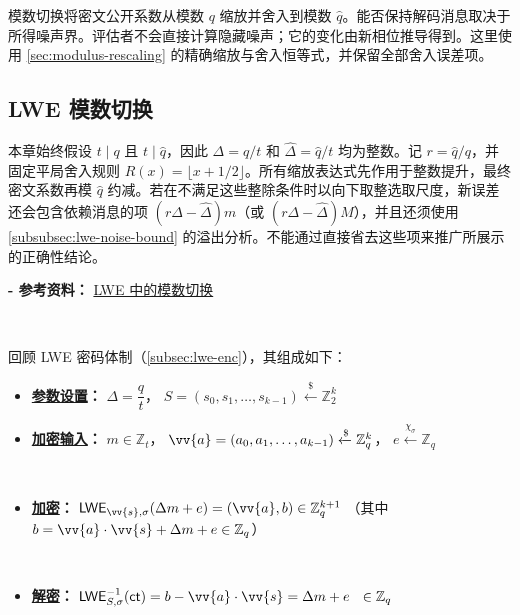 模数切换将密文公开系数从模数 $q$ 缩放并舍入到模数 $\hat q$。能否保持解码消息取决于所得噪声界。评估者不会直接计算隐藏噪声；它的变化由新相位推导得到。这里使用 \autoref{sec:modulus-rescaling} 的精确缩放与舍入恒等式，并保留全部舍入误差项。


\subsection{LWE 模数切换}
\label{subsec:modulus-switch-lwe}

本章始终假设 $t\mid q$ 且 $t\mid\hat q$，因此 $\Delta=q/t$ 和 $\hat\Delta=\hat q/t$ 均为整数。记 $r=\hat q/q$，并固定平局舍入规则 $R(x)=\lfloor x+1/2\rfloor$。所有缩放表达式先作用于整数提升，最终密文系数再模 $\hat q$ 约减。若在不满足这些整除条件时以向下取整选取尺度，新误差还会包含依赖消息的项 $(r\Delta-\hat\Delta)m$（或 $(r\Delta-\hat\Delta)M$），并且还须使用 \autoref{subsubsec:lwe-noise-bound} 的溢出分析。不能通过直接省去这些项来推广所展示的正确性结论。

\textbf{- 参考资料：}
\href{https://www.jeremykun.com/2022/07/16/modulus-switching-in-lwe/}{LWE 中的模数切换}

$ $

回顾 LWE 密码体制（\autoref{subsec:lwe-enc}），其组成如下：

\begin{itemize}
\item \textbf{\underline{参数设置}：} $\Delta = \dfrac{q}{t}$，\text{ } $S = (s_0, s_1, \ldots, s_{k-1}) \xleftarrow{\$} \mathbb{Z}_2^{k}$

\item \textbf{\underline{加密输入}：} $m \in \mathbb{Z}_t$，\text{ } $\vv{a} = (a_0, a_1, \ldots, a_{k-1}) \xleftarrow{\$} \mathbb{Z}_q^{k}$，\text{ } $e \xleftarrow{\chi_\sigma} \mathbb{Z}_q$

$ $

\item \textbf{\underline{加密}：} $\textsf{LWE}_{\vv{s},\sigma}(\Delta  m + e) = (\vv{a}, b) \in \mathbb{Z}_q^{k + 1}$ \text{ }（其中 $b = \vv{a} \cdot \vv{s} + \Delta  m + e \in \mathbb{Z}_q$）

$ $

\item \textbf{\underline{解密}：} $\textsf{LWE}^{-1}_{S,\sigma}(\textsf{ct}) = b - \vv{a}\cdot \vv{s} = \Delta  m + e \text{ } \text{ } \in \mathbb{Z}_q$

\end{itemize}

$ $


